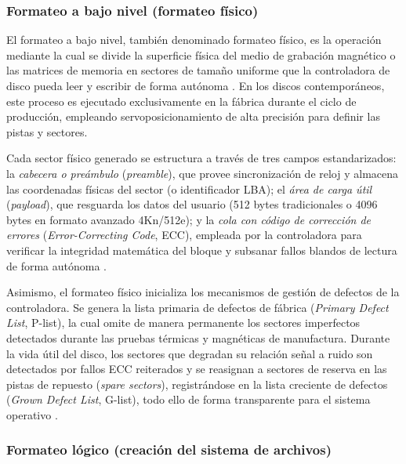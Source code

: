 \documentclass[12pt]{article}
\begin{document}
\subsubsection{Formateo a bajo nivel (formateo físico)}

El formateo a bajo nivel, también denominado formateo físico, es la operación mediante la cual se divide la superficie física del medio de grabación magnético o las matrices de memoria en sectores de tamaño uniforme que la controladora de disco pueda leer y escribir de forma autónoma \parencite[\S 12.5.1, p.\ 418]{silberschatz2006fundamentos}. En los discos contemporáneos, este proceso es ejecutado exclusivamente en la fábrica durante el ciclo de producción, empleando servoposicionamiento de alta precisión para definir las pistas y sectores.

Cada sector físico generado se estructura a través de tres campos estandarizados: la \textit{cabecera o preámbulo} (\textit{preamble}), que provee sincronización de reloj y almacena las coordenadas físicas del sector (o identificador LBA); el \textit{área de carga útil} (\textit{payload}), que resguarda los datos del usuario (512 bytes tradicionales o 4096 bytes en formato avanzado 4Kn/512e); y la \textit{cola con código de corrección de errores} (\textit{Error-Correcting Code}, ECC), empleada por la controladora para verificar la integridad matemática del bloque y subsanar fallos blandos de lectura de forma autónoma \parencite[\S 12.5.1, p.\ 418]{silberschatz2006fundamentos}.

Asimismo, el formateo físico inicializa los mecanismos de gestión de defectos de la controladora. Se genera la lista primaria de defectos de fábrica (\textit{Primary Defect List}, P-list), la cual omite de manera permanente los sectores imperfectos detectados durante las pruebas térmicas y magnéticas de manufactura. Durante la vida útil del disco, los sectores que degradan su relación señal a ruido son detectados por fallos ECC reiterados y se reasignan a sectores de reserva en las pistas de repuesto (\textit{spare sectors}), registrándose en la lista creciente de defectos (\textit{Grown Defect List}, G-list), todo ello de forma transparente para el sistema operativo \parencite[\S 12.5.3, pp.\ 420--421]{silberschatz2006fundamentos}.

\subsubsection{Formateo lógico (creación del sistema de archivos)}
\end{document}
